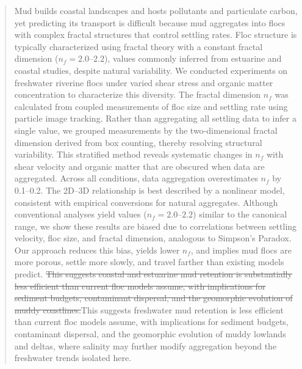 \documentclass{agujournal2019}
\providecommand{\DIFadd}[1]{{\protect\color{blue}#1}}
\providecommand{\DIFdel}[1]{{\protect\color{red}\sout{#1}}}
\begin{document}
\begin{abstract}
Mud builds coastal landscapes and hosts pollutants and particulate carbon, yet predicting its transport is difficult because mud aggregates into flocs with complex fractal structures that control settling rates. Floc structure is typically characterized using fractal theory with a constant fractal dimension ($n_f = 2.0$--$2.2$)\DIFadd{, values commonly inferred from estuarine and coastal studies,} despite natural variability. We conducted experiments on freshwater riverine flocs under varied shear stress and organic matter concentration to characterize this diversity. The fractal dimension $n_f$ was calculated from coupled measurements of floc size and settling rate using particle image tracking. Rather than aggregating all settling data to infer a single value, we grouped measurements by the two-dimensional fractal dimension derived from box counting, thereby resolving structural variability. This stratified method reveals systematic changes in $n_f$ with shear velocity and organic matter that are obscured when data are aggregated. Across all conditions, data aggregation overestimates $n_f$ by 0.1--0.2. The 2D--3D relationship is best described by a nonlinear model, consistent with empirical conversions for natural aggregates. Although conventional analyses yield values ($n_f = 2.0$--$2.2$) similar to the canonical range, we show these results are biased due to correlations between settling velocity, floc size, and fractal dimension, analogous to Simpson’s Paradox. Our approach reduces this bias, yields lower $n_f$, and implies mud flocs are more porous, settle more slowly, and travel farther than existing models predict. \DIFdel{This suggests coastal and estuarine mud retention is substantially less efficient than current floc models assume, with implications for sediment budgets, contaminant dispersal, and the geomorphic evolution of muddy coastlines.}\DIFadd{This suggests freshwater mud retention is less efficient than current floc models assume, with implications for sediment budgets, contaminant dispersal, and the geomorphic evolution of muddy lowlands and deltas, where salinity may further modify aggregation beyond the freshwater trends isolated here.}
\end{abstract}
\end{document}
